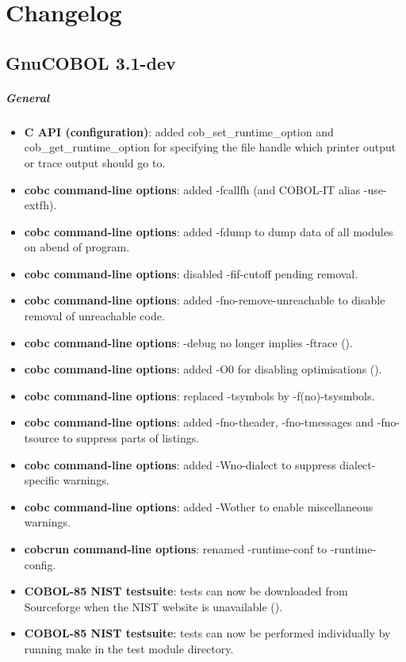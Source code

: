 \chapter{Changelog}

\section{GnuCOBOL 3.1-dev}

\paragraph{General}
\begin{itemize}
\item \textbf{C API (configuration)}: added cob\_set\_runtime\_option and cob\_get\_runtime\_option for specifying the file handle which printer output or trace output should go to.
\item \textbf{cobc command-line options}: added -fcallfh (and COBOL-IT alias -use-extfh).
\item \textbf{cobc command-line options}: added -fdump to dump data of all modules on abend of program.
\item \textbf{cobc command-line options}: disabled -fif-cutoff pending removal.
\item \textbf{cobc command-line options}: added -fno-remove-unreachable to disable removal of unreachable code.
\item \textbf{cobc command-line options}: -debug no longer implies -ftrace ().
\item \textbf{cobc command-line options}: added -O0 for disabling optimisations ().
\item \textbf{cobc command-line options}: replaced -tsymbols by -f(no)-tsysmbols.
\item \textbf{cobc command-line options}: added -fno-theader, -fno-tmessages and -fno-tsource to suppress parts of listings.
\item \textbf{cobc command-line options}: added -Wno-dialect to suppress dialect-specific warnings.
\item \textbf{cobc command-line options}: added -Wother to enable miscellaneous warnings.
\item \textbf{cobcrun command-line options}: renamed -runtime-conf to -runtime-config.
\item \textbf{COBOL-85 NIST testsuite}: tests can now be downloaded from Sourceforge when the NIST website is unavailable ().
\item \textbf{COBOL-85 NIST testsuite}: tests can now be performed individually by running make in the test module directory.

\end{itemize}
